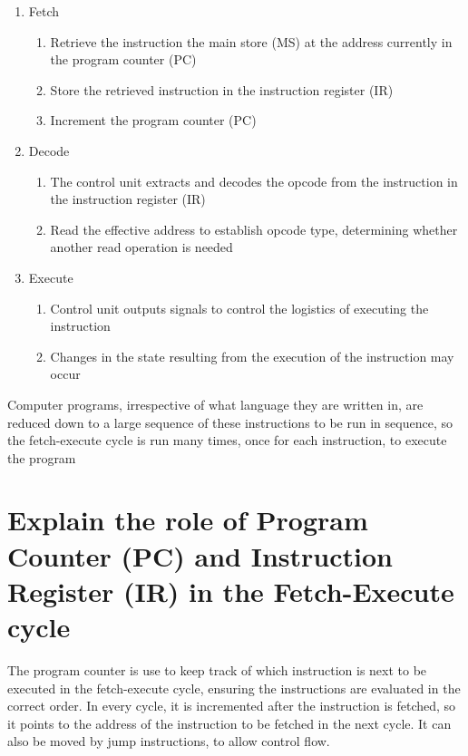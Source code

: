 \documentclass{article}
\begin{document}
\begin{enumerate}
\item
  Fetch
  \begin{enumerate}
  \item
    Retrieve the instruction the main store (MS) at the address currently in the
    program counter (PC)
  \item
    Store the retrieved instruction in the instruction register (IR)
  \item
    Increment the program counter (PC)
  \end{enumerate}
\item
  Decode
  \begin{enumerate}
  \item
    The control unit extracts and decodes the opcode from the instruction in the
    instruction register (IR)
  \item
    Read the effective address to establish opcode type, determining whether
    another read operation is needed
  \end{enumerate}
\item
  Execute
  \begin{enumerate}
  \item
    Control unit outputs signals to control the logistics of executing the
    instruction
  \item
    Changes in the state resulting from the execution of the instruction may
    occur
  \end{enumerate}
\end{enumerate}

Computer programs, irrespective of what language they are written in, are
reduced down to a large sequence of these instructions to be run in sequence, so
the fetch-execute cycle is run many times, once for each instruction, to execute
the program



\section{Explain the role of Program Counter (PC) and Instruction Register (IR)
in the Fetch-Execute cycle}

The program counter is use to keep track of which instruction is next to be
executed in the fetch-execute cycle, ensuring the instructions are evaluated in
the correct order. In every cycle, it is incremented after the instruction is
fetched, so it points to the address of the instruction to be fetched in the
next cycle. It can also be moved by jump instructions, to allow control flow.
\end{document}
